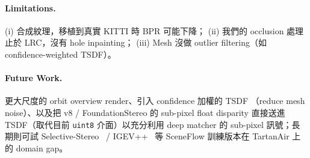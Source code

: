 \documentclass[11pt,a4paper]{article}
\begin{document}
\paragraph{Limitations.}
(i) 合成紋理，移植到真實 KITTI 時 BPR 可能下降；
(ii) 我們的 occlusion 處理止於 LRC，沒有 hole inpainting；
(iii) Mesh 沒做 outlier filtering（如 confidence-weighted TSDF）。

\paragraph{Future Work.}
更大尺度的 orbit overview render、引入 confidence 加權的 TSDF
（reduce mesh noise）、以及把 v8 / FoundationStereo 的 sub-pixel float disparity
直接送進 TSDF（取代目前 \texttt{uint8} 介面）以充分利用 deep matcher 的
sub-pixel 訊號；長期則可試 Selective-Stereo~\cite{Wang2024Selective} /
IGEV++~\cite{Xu2025} 等 SceneFlow 訓練版本在 TartanAir 上的 domain gap。

\printbibliography
\end{document}

